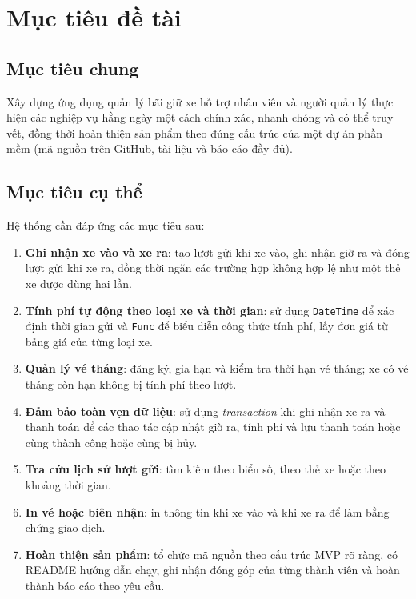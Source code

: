 \section{Mục tiêu đề tài}

\subsection{Mục tiêu chung}

Xây dựng ứng dụng quản lý bãi giữ xe hỗ trợ nhân viên và người quản lý thực hiện các nghiệp vụ hằng ngày một cách chính xác, nhanh chóng và có thể truy vết, đồng thời hoàn thiện sản phẩm theo đúng cấu trúc của một dự án phần mềm (mã nguồn trên GitHub, tài liệu và báo cáo đầy đủ).

\subsection{Mục tiêu cụ thể}

Hệ thống cần đáp ứng các mục tiêu sau:

\begin{enumerate}
  \item \textbf{Ghi nhận xe vào và xe ra}: tạo lượt gửi khi xe vào, ghi nhận giờ ra và đóng lượt gửi khi xe ra, đồng thời ngăn các trường hợp không hợp lệ như một thẻ xe được dùng hai lần.
  \item \textbf{Tính phí tự động theo loại xe và thời gian}: sử dụng \texttt{DateTime} để xác định thời gian gửi và \texttt{Func} để biểu diễn công thức tính phí, lấy đơn giá từ bảng giá của từng loại xe.
  \item \textbf{Quản lý vé tháng}: đăng ký, gia hạn và kiểm tra thời hạn vé tháng; xe có vé tháng còn hạn không bị tính phí theo lượt.
  \item \textbf{Đảm bảo toàn vẹn dữ liệu}: sử dụng \textit{transaction} khi ghi nhận xe ra và thanh toán để các thao tác cập nhật giờ ra, tính phí và lưu thanh toán hoặc cùng thành công hoặc cùng bị hủy.
  \item \textbf{Tra cứu lịch sử lượt gửi}: tìm kiếm theo biển số, theo thẻ xe hoặc theo khoảng thời gian.
  \item \textbf{In vé hoặc biên nhận}: in thông tin khi xe vào và khi xe ra để làm bằng chứng giao dịch.
  \item \textbf{Hoàn thiện sản phẩm}: tổ chức mã nguồn theo cấu trúc MVP rõ ràng, có README hướng dẫn chạy, ghi nhận đóng góp của từng thành viên và hoàn thành báo cáo theo yêu cầu.
\end{enumerate}

